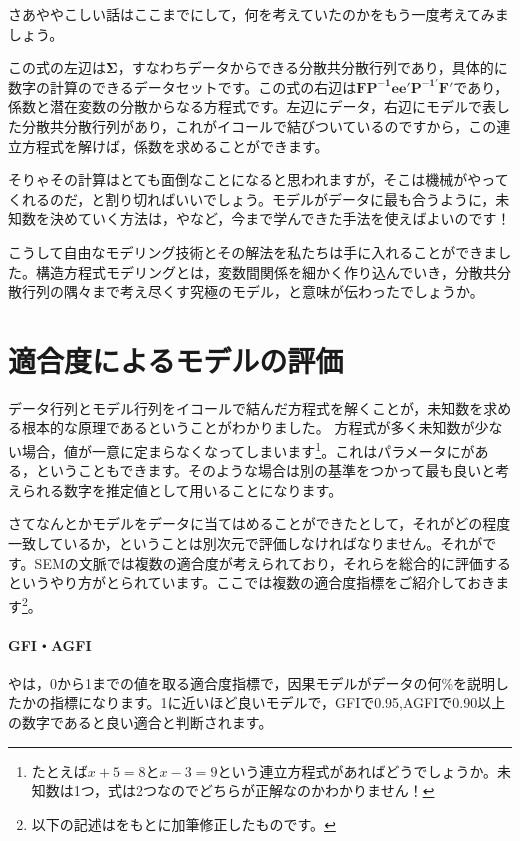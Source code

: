 \documentclass{ltjsbook}
\begin{document}
さあややこしい話はここまでにして，何を考えていたのかをもう一度考えてみましょう。

この式の左辺は$\bm{\Sigma}$，すなわちデータからできる分散共分散行列であり，具体的に数字の計算のできるデータセットです。この式の右辺は$\bm{ FP^{-1} ee' P^{-1'} F' } $であり，係数と潜在変数の分散からなる方程式です。左辺にデータ，右辺にモデルで表した分散共分散行列があり，これがイコールで結びついているのですから，この連立方程式を解けば，係数を求めることができます。

そりゃその計算はとても面倒なことになると思われますが，そこは機械がやってくれるのだ，と割り切ればいいでしょう。モデルがデータに最も合うように，未知数を決めていく方法は，やなど，今まで学んできた手法を使えばよいのです！

こうして自由なモデリング技術とその解法を私たちは手に入れることができました。構造方程式モデリングとは，変数間関係を細かく作り込んでいき，分散共分散行列の隅々まで考え尽くす究極のモデル，と意味が伝わったでしょうか。

\section{適合度によるモデルの評価}

データ行列とモデル行列をイコールで結んだ方程式を解くことが，未知数を求める根本的な原理であるということがわかりました。
方程式が多く未知数が少ない場合，値が一意に定まらなくなってしまいます\footnote{たとえば$x+5=8$と$x-3=9$という連立方程式があればどうでしょうか。未知数は1つ，式は2つなのでどちらが正解なのかわかりません！}。これはパラメータにがある，ということもできます。そのような場合は別の基準をつかって最も良いと考えられる数字を推定値として用いることになります。

さてなんとかモデルをデータに当てはめることができたとして，それがどの程度一致しているか，ということは別次元で評価しなければなりません。それがです。SEMの文脈では複数の適合度が考えられており，それらを総合的に評価するというやり方がとられています。ここでは複数の適合度指標をご紹介しておきます\footnote{以下の記述は\textcite{Kosugi2014Mplus}をもとに加筆修正したものです。}。

\paragraph{GFI・AGFI} やは，0から1までの値を取る適合度指標で，因果モデルがデータの何\%を説明したかの指標になります。1に近いほど良いモデルで，GFIで0.95,AGFIで0.90以上の数字であると良い適合と判断されます。
\end{document}
